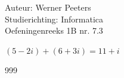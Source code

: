 \documentclass[a4paper]{article}
\begin{document}
  
\noindent \large Auteur: Werner Peeters\\
\noindent \large Studierichting: Informatica\\
\noindent \large Oefeningenreeks 1B nr. 7.3\\

\medskip

\normalsize

$(5-2i)+(6+3i) = 11+i$

\begin{thebibliography}{999}
\end{thebibliography}
\end{document}
